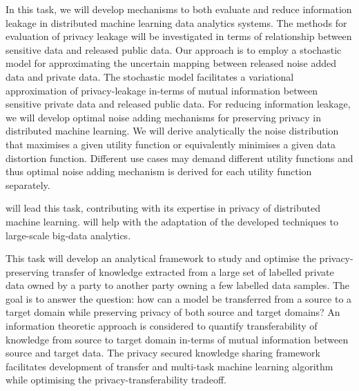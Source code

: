 \begin{Workpackage}{\thewpno}
\begin{Task}
\end{Task}
 
\begin{Task}
  
  \TaskResults{%
  \ref{del:bigdata1}
   \ref{del:bigdata2}
   \ref{del:bigdata3}
  }
  \TaskHeader{}
  In this task, we will develop mechanisms to both evaluate and reduce information leakage in distributed machine learning data analytics systems. The methods for evaluation of privacy leakage will be investigated in terms of relationship between sensitive data and released public data. Our approach is to employ a stochastic model for approximating the uncertain mapping between released noise added data and private data. The stochastic model facilitates a variational approximation of privacy-leakage in-terms of mutual information between sensitive private data and released public data. For reducing information leakage, we will develop optimal noise adding mechanisms for preserving privacy in distributed machine learning. We will derive analytically the noise distribution that maximises a given utility function or equivalently minimises a given data distortion function. Different use cases may demand different utility functions and thus optimal noise adding mechanism is derived for each utility function separately.
  
\SCCHshort{} will lead this task, contributing with its expertise in privacy of distributed machine learning. \UODshort{} will help with the adaptation of the developed techniques to large-scale big-data analytics. 

 \end{Task}

 \begin{Task}
  
  \TaskResults{%
    \ref{del:bigdata1}
   \ref{del:bigdata2}
   \ref{del:bigdata3}
  }
  \TaskHeader{}
  This task will develop an analytical framework to study and optimise the privacy-preserving transfer of knowledge extracted from a large set of labelled private data owned by a party to another party owning a few labelled data samples. The goal is to answer the question: how can a model be transferred from a source to a target domain while preserving privacy of both source and target domains? An information theoretic approach is considered to quantify transferability of knowledge from source to target domain in-terms of mutual information between source and target data. The privacy secured knowledge sharing framework facilitates development of transfer and multi-task machine learning algorithm while optimising the privacy-transferability tradeoff.
  

\end{Task}
\end{Workpackage}
